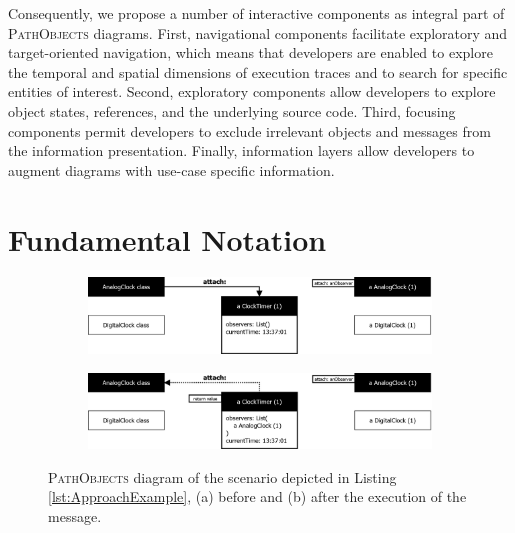 Consequently, we propose a number of interactive components as integral part of \textsc{PathObjects} diagrams.
First, navigational components facilitate exploratory and target-oriented navigation, which means that developers are enabled to explore the temporal and spatial dimensions of execution traces and to search for specific entities of interest.
Second, exploratory components allow developers to explore object states, references, and the underlying source code.
Third, focusing components permit developers to exclude irrelevant objects and messages from the information presentation. 
Finally, information layers allow developers to augment diagrams with use-case specific information.

\section{Fundamental Notation}
\label{s:ApproachNotation}

\begin{figure}[tb]
	\centering
	
	\begin{subfigure}[b]{1.0\textwidth}
		\centering
        \includegraphics[width=\textwidth]{../images/03-PathObjects-Before}
        \caption[Before the Execution of the Current Message]{}
		\label{fig:ApproachBasicBefore}
	\end{subfigure}
	
	\vspace{1.0cm}
	
	\begin{subfigure}[b]{1.0\textwidth}
		\centering
		\includegraphics[width=\textwidth]{../images/03-PathObjects-After}
		\caption[After the Execution of the Current Message]{}
		\label{fig:ApproachBasicAfter}
	\end{subfigure}
	
	\caption[Exemplary \textsc{PathObjects} Diagram]{\textsc{PathObjects} diagram of the scenario depicted in Listing \ref{lst:ApproachExample}, (a) before and (b) after the execution of the  message.}
	\label{fig:ApproachBasic}
\end{figure}

